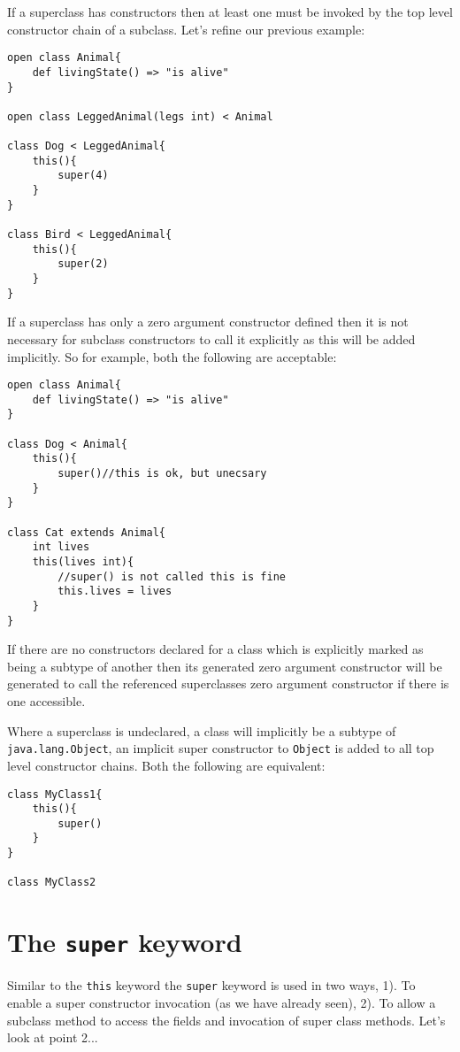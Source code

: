 \documentclass[conc-doc]{subfiles}
\begin{document}
If a superclass has constructors then at least one must be invoked by the top level constructor chain of a subclass. Let's refine our previous example:

\begin{lstlisting}
open class Animal{
	def livingState() => "is alive"
}

open class LeggedAnimal(legs int) < Animal

class Dog < LeggedAnimal{
	this(){
		super(4)
	}
}

class Bird < LeggedAnimal{
	this(){
		super(2)
	}
}
\end{lstlisting}

If a superclass has only a zero argument constructor defined then it is not necessary for subclass constructors to call it explicitly as this will be added implicitly. So for example, both the following are acceptable:

\begin{lstlisting}
open class Animal{
	def livingState() => "is alive"
}

class Dog < Animal{
	this(){
		super()//this is ok, but unecsary
	}
}

class Cat extends Animal{
	int lives
	this(lives int){
		//super() is not called this is fine
		this.lives = lives
	}
}
\end{lstlisting}

If there are no constructors declared for a class which is explicitly marked as being a subtype of another then its generated zero argument constructor will be generated to call the referenced superclasses zero argument constructor if there is one accessible.

Where a superclass is undeclared, a class will implicitly be a subtype of \lstinline{java.lang.Object}, an implicit super constructor to \lstinline{Object} is added to all top level constructor chains. Both the following are equivalent:

\begin{lstlisting}
class MyClass1{
	this(){
		super()
	}
}

class MyClass2
\end{lstlisting}

\section{The \lstinline{super} keyword}
Similar to the \lstinline{this} keyword the \lstinline{super} keyword is used in two ways, 1). To enable a super constructor invocation (as we have already seen), 2). To allow a subclass method to access the fields and invocation of super class methods. Let's look at point 2...
\end{document}

